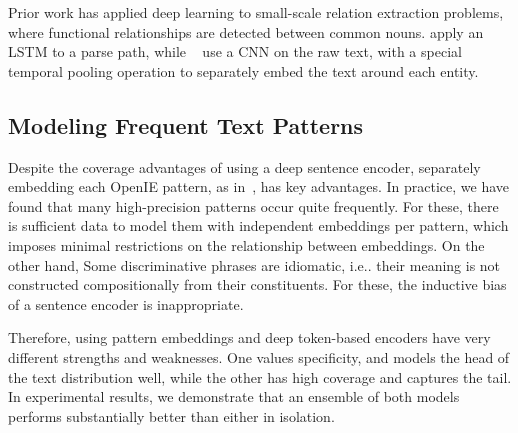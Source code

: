 Prior work has applied deep learning to small-scale relation extraction problems, where functional relationships are detected between common nouns. \citet{xu2015classifying} apply an LSTM to a parse path, while ~\citet{zengdistant} use a CNN on the raw text, with a special temporal pooling operation to separately embed the text around each entity.

\subsection{Modeling Frequent Text Patterns}
\label{sec:non-comp}

Despite the coverage advantages of using a deep sentence encoder, separately embedding each OpenIE pattern, as in~\citet{limin}, has key advantages. In practice, we have found that many high-precision patterns occur quite frequently. For these, there is sufficient data to model them with independent embeddings per pattern, which imposes minimal restrictions on the relationship between embeddings. On the other hand, Some discriminative phrases are idiomatic, i.e.. their meaning is not constructed compositionally from their constituents. For these, the inductive bias of a sentence encoder is inappropriate. 

Therefore, using pattern embeddings and deep token-based encoders have very different strengths and weaknesses. One values specificity, and models the head of the text distribution well, while the other has high coverage and captures the tail. In experimental results, we demonstrate that an ensemble of both models performs substantially better than either in isolation.



